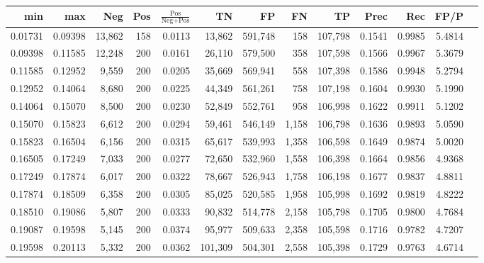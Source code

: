 \begin{tabular}{rrrrrrrrrrrrr}
\toprule
    min &     max &    Neg & Pos & $\frac{\text{Pos}}{\text{Neg}+\text{Pos}}$ &      TN &      FP &      FN &      TP &   Prec &    Rec &   FP/P \\
\midrule
0.01731 & 0.09398 & 13,862 & 158 &                                     0.0113 &  13,862 & 591,748 &     158 & 107,798 & 0.1541 & 0.9985 & 5.4814 \\
0.09398 & 0.11585 & 12,248 & 200 &                                     0.0161 &  26,110 & 579,500 &     358 & 107,598 & 0.1566 & 0.9967 & 5.3679 \\
0.11585 & 0.12952 &  9,559 & 200 &                                     0.0205 &  35,669 & 569,941 &     558 & 107,398 & 0.1586 & 0.9948 & 5.2794 \\
0.12952 & 0.14064 &  8,680 & 200 &                                     0.0225 &  44,349 & 561,261 &     758 & 107,198 & 0.1604 & 0.9930 & 5.1990 \\
0.14064 & 0.15070 &  8,500 & 200 &                                     0.0230 &  52,849 & 552,761 &     958 & 106,998 & 0.1622 & 0.9911 & 5.1202 \\
0.15070 & 0.15823 &  6,612 & 200 &                                     0.0294 &  59,461 & 546,149 &   1,158 & 106,798 & 0.1636 & 0.9893 & 5.0590 \\
0.15823 & 0.16504 &  6,156 & 200 &                                     0.0315 &  65,617 & 539,993 &   1,358 & 106,598 & 0.1649 & 0.9874 & 5.0020 \\
0.16505 & 0.17249 &  7,033 & 200 &                                     0.0277 &  72,650 & 532,960 &   1,558 & 106,398 & 0.1664 & 0.9856 & 4.9368 \\
0.17249 & 0.17874 &  6,017 & 200 &                                     0.0322 &  78,667 & 526,943 &   1,758 & 106,198 & 0.1677 & 0.9837 & 4.8811 \\
0.17874 & 0.18509 &  6,358 & 200 &                                     0.0305 &  85,025 & 520,585 &   1,958 & 105,998 & 0.1692 & 0.9819 & 4.8222 \\
0.18510 & 0.19086 &  5,807 & 200 &                                     0.0333 &  90,832 & 514,778 &   2,158 & 105,798 & 0.1705 & 0.9800 & 4.7684 \\
0.19087 & 0.19598 &  5,145 & 200 &                                     0.0374 &  95,977 & 509,633 &   2,358 & 105,598 & 0.1716 & 0.9782 & 4.7207 \\
0.19598 & 0.20113 &  5,332 & 200 &                                     0.0362 & 101,309 & 504,301 &   2,558 & 105,398 & 0.1729 & 0.9763 & 4.6714 \\

\end{tabular}

